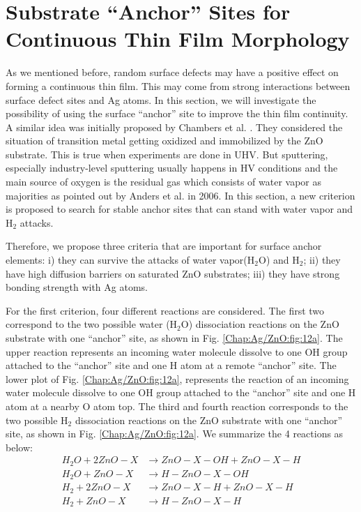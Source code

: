 \section{Substrate ``Anchor'' Sites for Continuous Thin Film Morphology}
\label{Chap:Ag/ZnO:section:anchor}

As we mentioned before, random surface defects may have a positive effect on forming a continuous thin film. This may come from strong interactions between surface defect sites and Ag atoms. In this section, we will investigate the possibility of using the surface ``anchor'' site to improve the thin film continuity. A similar idea was initially proposed by Chambers et al. \cite{chambers2002laminar}. They considered the situation of transition metal getting oxidized and immobilized by the ZnO substrate. This is true when experiments are done in \ac{UHV}. But sputtering, especially industry-level sputtering usually happens in \ac{HV} conditions and the main source of oxygen is the residual gas which consists of water vapor as majorities as pointed out by Anders et al. \cite{anders2006smoothing} in 2006. In this section, a new criterion is proposed to search for stable anchor sites that can stand with water vapor and $\text{H}_{\text{2}}$ attacks. 

Therefore, we propose three criteria that are important for surface anchor elements: i) they can survive the attacks of water vapor($\text{H}_{\text{2}}\text{O}$) and $\text{H}_{\text{2}}$; ii) they have high diffusion barriers on saturated ZnO substrates; iii) they have strong bonding strength with Ag atoms.

For the first criterion, four different reactions are considered. The first two correspond to the two possible water ($\text{H}_{\text{2}}\text{O}$) dissociation reactions on the ZnO substrate with one ``anchor'' site, as shown in Fig. \ref{Chap:Ag/ZnO:fig:12a}. The upper reaction represents an incoming water molecule dissolve to one OH group attached to the ``anchor'' site and one H atom at a remote ``anchor'' site. The lower plot of Fig. \ref{Chap:Ag/ZnO:fig:12a}, represents the reaction of an incoming water molecule dissolve to one OH group attached to the ``anchor'' site and one H atom at a nearby O atom top. The third and fourth reaction corresponds to the two possible $\text{H}_{\text{2}}$ dissociation reactions on the ZnO substrate with one ``anchor'' site, as shown in Fig. \ref{Chap:Ag/ZnO:fig:12a}. We summarize the 4 reactions as below:
\begin{subequations}
\begin{align}
H_2O + 2 ZnO-X & \rightarrow ZnO-X-OH + ZnO-X-H
 \label{Chap:Ag/ZnO:eq:anchor1}\\
H_2O + ZnO-X & \rightarrow H-ZnO-X-OH
 \label{Chap:Ag/ZnO:eq:anchor2}\\
H_2 + 2 ZnO-X & \rightarrow ZnO-X-H + ZnO-X-H
 \label{Chap:Ag/ZnO:eq:anchor3}\\
H_2 + ZnO-X & \rightarrow H-ZnO-X-H
 \label{Chap:Ag/ZnO:eq:anchor4}
\end{align}
\end{subequations}


